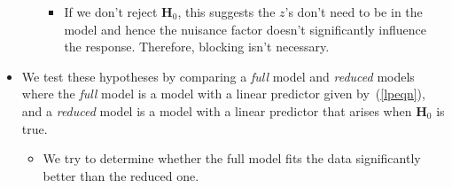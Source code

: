 \begin{itemize}
\begin{enumerate}[(1)]
\begin{itemize}
                              \item If we don't reject $ \mathbf{H}_0 $, this suggests the $ z $'s don't need to be in the model
                                    and hence the nuisance factor doesn't significantly influence the response. Therefore, blocking isn't necessary.
                        \end{itemize}
            \end{enumerate}
      \item We test these hypotheses by comparing a \emph{full} model and \emph{reduced} models where the \emph{full} model
            is a model with a linear predictor given by~(\ref{lpeqn}), and a \emph{reduced} model is a model with a linear predictor that arises when $ \mathbf{H}_0 $
            is true.
            \begin{itemize}
                  \item We try to determine whether the full model fits the data significantly better than the reduced one.
            \end{itemize}
\end{itemize}
